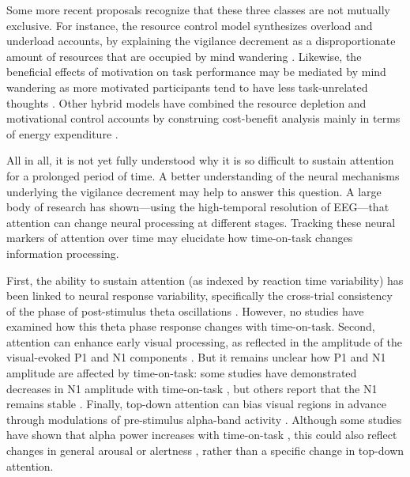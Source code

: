 \documentclass[11pt,]{memoir}
\begin{document}
Some more recent proposals recognize that these three classes are not mutually exclusive. For instance, the resource control model synthesizes overload and underload accounts, by explaining the vigilance decrement as a disproportionate amount of resources that are occupied by mind wandering \autocite{Thomson2015}. Likewise, the beneficial effects of motivation on task performance may be mediated by mind wandering \autocite{Mrazek2012} as more motivated participants tend to have less task-unrelated thoughts \autocites{Seli2015}{Seli2017}. Other hybrid models have combined the resource depletion and motivational control accounts by construing cost-benefit analysis mainly in terms of energy expenditure \autocites{Boksem2008}{Christie2015}.

All in all, it is not yet fully understood why it is so difficult to sustain attention for a prolonged period of time. A better understanding of the neural mechanisms underlying the vigilance decrement may help to answer this question. A large body of research has shown---using the high-temporal resolution of EEG---that attention can change neural processing at different stages. Tracking these neural markers of attention over time may elucidate how time-on-task changes information processing.

First, the ability to sustain attention (as indexed by reaction time variability) has been linked to neural response variability, specifically the cross-trial consistency of the phase of post-stimulus theta oscillations \autocite{Lutz2009}. However, no studies have examined how this theta phase response changes with time-on-task. Second, attention can enhance early visual processing, as reflected in the amplitude of the visual-evoked P1 and N1 components \autocites{Eason1969}{Luck1994}{Mangun1991}. But it remains unclear how P1 and N1 amplitude are affected by time-on-task: some studies have demonstrated decreases in N1 amplitude with time-on-task \autocites{Boksem2005}{Faber2012}, but others report that the N1 remains stable \autocites{Koelega1992}{Bonnefond2010}. Finally, top-down attention can bias visual regions in advance through modulations of pre-stimulus alpha-band activity \autocites{OConnell2009}{Mazaheri2014}. Although some studies have shown that alpha power increases with time-on-task \autocites{Boksem2005}{Bonnefond2010}{Bonnefond2011}, this could also reflect changes in general arousal or alertness \autocites{Cajochen1995}{Drapeau2004}, rather than a specific change in top-down attention.
\end{document}
